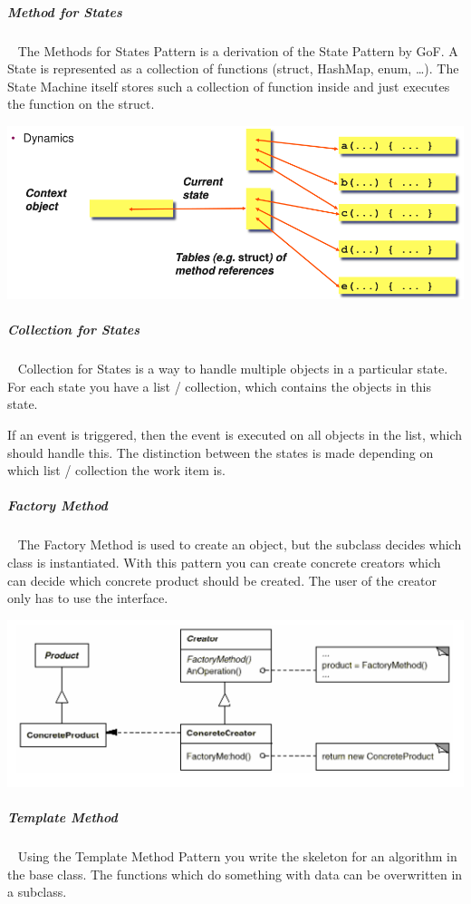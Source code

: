 \documentclass[11pt,twoside,landscape]{article}
\begin{document}
\begin{multicols}{3}
\subparagraph{Method for States} \
\label{sec:org7fd2fcb}
The Methods for States Pattern is a derivation of the State Pattern by GoF.
A State is represented as a collection of functions (struct, HashMap, enum, \ldots{}).
The State Machine itself stores such a collection of function inside and just executes the function on the struct.


{
\begin{center}
\includegraphics[width=.9\linewidth]{img/methods_for_states.png}
\end{center}
\label{NAME: Methods For State Example}
}
\subparagraph{Collection for States} \
\label{sec:org83bfaa8}
Collection for States is a way to handle multiple objects in a particular state.
For each state you have a list / collection, which contains the objects in this state.

If an event is triggered, then the event is executed on all objects in the list, which should handle this.
The distinction between the states is made depending on which list / collection the work item is.
\subparagraph{Factory Method} \
\label{sec:org5b408f6}
The Factory Method is used to create an object, but the subclass decides which class is instantiated.
With this pattern you can create concrete creators which can decide which concrete product should be created.
The user of the creator only has to use the interface.


{
\begin{center}
\includegraphics[width=.9\linewidth]{img/factory_method.png}
\end{center}
\label{fig:factory-method-class-diagram}
}
\subparagraph{Template Method} \
\label{sec:org199e4b4}
Using the Template Method Pattern you write the skeleton for an algorithm in the base class.
The functions which do something with data can be overwritten in a subclass.


\end{multicols}
\end{document}
